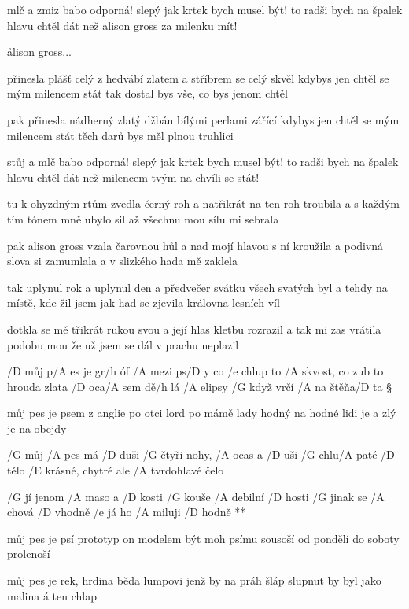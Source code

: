 mlč a zmiz babo odporná!
slepý jak krtek bych musel být!
to radši bych na špalek hlavu chtěl dát
než alison gross za milenku mít!

\r  alison gross...

přinesla plášť celý z hedvábí
zlatem a stříbrem se celý skvěl
kdybys jen chtěl se mým milencem stát
tak dostal bys vše, co bys jenom chtěl \s

pak přinesla nádherný zlatý džbán
bílými perlami zářící
kdybys jen chtěl se mým milencem stát
těch darů bys měl plnou truhlici \s

stůj a mlč babo odporná!
slepý jak krtek bych musel být!
to radši bych na špalek hlavu chtěl dát
než milencem tvým na chvíli se stát! \songgg

\rr

tu k ohyzdným rtům zvedla černý roh
a natřikrát na ten roh troubila
a s každým tím tónem mně ubylo sil
až všechnu mou sílu mi sebrala \s

pak alison gross vzala čarovnou hůl
a nad mojí hlavou s ní kroužila
a podivná slova si zamumlala
a v slizkého hada mě zaklela

\rr

tak uplynul rok a uplynul den
a předvečer svátku všech svatých byl
a tehdy na místě, kde žil jsem jak had
se zjevila královna lesních víl \s

dotkla se mě třikrát rukou svou
a její hlas kletbu rozrazil
a tak mi zas vrátila podobu mou
že už jsem se dál v prachu neplazil

\rr




/D můj p/A es je gr/h óf /A mezi ps/D y
co /e chlup to /A skvost, co zub to hrouda zlata
/D oca/A sem dě/h lá /A elipsy
/G když vrčí /A na štěňa/D ta \S

můj pes je psem z anglie
po otci lord po mámě lady
hodný na hodné lidi je
a zlý je na obejdy \s

/G můj /A pes má /D duši
/G čtyři nohy, /A ocas a /D uši
/G chlu/A paté /D tělo
/E krásné, chytré ale /A tvrdohlavé čelo

\R  /G jí jenom /A maso a /D kosti
    /G kouše /A debilní /D hosti
    /G jinak se /A chová /D vhodně
    /e já ho /A miluji /D hodně **

můj pes je psí prototyp
on modelem být moh psímu sousoší
od pondělí do soboty
prolenoší \s

můj pes je rek, hrdina
běda lumpovi jenž by na práh šláp
slupnut by byl jako malina
á ten chlap \s

